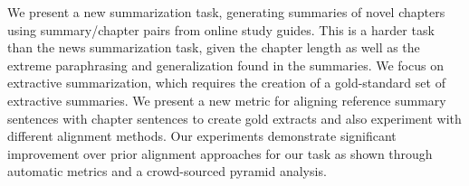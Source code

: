We present a new summarization task, generating summaries of novel chapters using summary/chapter pairs from online study guides. This is a harder task than the news summarization task, given the chapter length as well as the extreme paraphrasing and generalization found in the summaries. We focus on extractive summarization, which requires the creation of a gold-standard set of extractive summaries. We present a new metric for aligning reference summary sentences with chapter sentences to create gold extracts and also experiment with different alignment methods. Our experiments demonstrate significant improvement over prior alignment approaches for our task as shown through automatic metrics and a crowd-sourced pyramid analysis.
